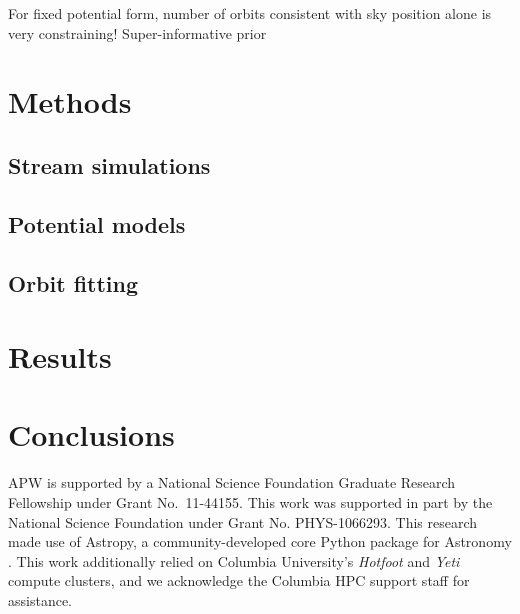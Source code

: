 \documentclass[letterpaper,12pt,preprint]{aastex}
\begin{document}
For fixed potential form, number of orbits consistent with sky position alone is
very constraining! Super-informative prior

\section{Methods}\label{sec:methods}

\subsection{Stream simulations}\label{sec:stream-sims}

\subsection{Potential models}\label{sec:potentials}

\subsection{Orbit fitting}\label{sec:orbitfit}

\section{Results}\label{sec:results}

\subsection{}

\section{Conclusions}\label{sec:conclusions}

\acknowledgements
APW is supported by a National Science Foundation Graduate Research Fellowship
under Grant No.\ 11-44155. This work was supported in part by the National
Science Foundation under Grant No. PHYS-1066293. This research made use of
Astropy, a community-developed core Python package for Astronomy
\citep{astropy13}. This work additionally relied on Columbia University's
\emph{Hotfoot} and \emph{Yeti} compute clusters, and we acknowledge the Columbia
HPC support staff for assistance. \\

%
%
\end{document}
